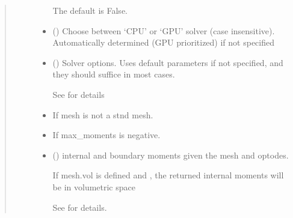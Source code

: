 \documentclass[letterpaper,10pt,english]{sphinxmanual}
\begin{document}
\begin{fulllineitems}
\begin{quote}
\begin{description}
\begin{itemize}
\sphinxAtStartPar
The default is False.


\item {} 
\sphinxAtStartPar
{} (\sphinxstyleliteralemphasis{\sphinxupquote{, }}) \textendash{} Choose between ‘CPU’ or ‘GPU’ solver (case insensitive). Automatically determined (GPU prioritized) if not specified

\item {} 
\sphinxAtStartPar
{} ({\hyperref[\detokenize{_autosummary/nirfasterff.utils.SolverOptions:nirfasterff.utils.SolverOptions}]{}}\sphinxstyleliteralemphasis{\sphinxupquote{, }}) \textendash{} 
\sphinxAtStartPar
Solver options. Uses default parameters if not specified, and they should suffice in most cases.

\sphinxAtStartPar
See {\hyperref[\detokenize{_autosummary/nirfasterff.utils.SolverOptions:nirfasterff.utils.SolverOptions}]{}} for details


\end{itemize}

\begin{itemize}
\item {} 
\sphinxAtStartPar
{} \textendash{} If mesh is not a stnd mesh.

\item {} 
\sphinxAtStartPar
{} \textendash{} If max\_moments is negative.

\end{itemize}

\sphinxAtStartPar
\begin{itemize}
\item {} 
\sphinxAtStartPar
{} () \textendash{} internal and boundary moments given the mesh and optodes.

\sphinxAtStartPar
If mesh.vol is defined and , the returned internal moments will be in volumetric space

\sphinxAtStartPar
See {\hyperref[\detokenize{_autosummary/nirfasterff.base.data.TRMomentsdata:nirfasterff.base.data.TRMomentsdata}]{}} for details.


\end{itemize}
\end{description}
\end{quote}
\end{fulllineitems}
\end{document}
